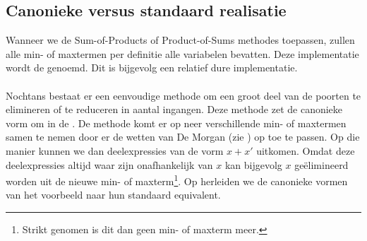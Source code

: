\subsection{Canonieke versus standaard realisatie}
Wanneer we de Sum-of-Products of Product-of-Sums methodes toepassen, zullen alle min- of maxtermen per definitie alle variabelen bevatten. Deze implementatie wordt de  genoemd. Dit is bijgevolg een relatief dure implementatie.

\paragraph{}
Nochtans bestaat er een eenvoudige methode om een groot deel van de poorten te elimineren of te reduceren in aantal ingangen. Deze methode zet de canonieke vorm om in de . De methode komt er op neer verschillende min- of maxtermen samen te nemen door er de wetten van De Morgan (zie ) op toe te passen. Op die manier kunnen we dan deelexpressies van de vorm $x+x'$ uitkomen. Omdat deze deelexpressies altijd waar zijn onafhankelijk van $x$ kan bijgevolg $x$ ge\"elimineerd worden uit de nieuwe min- of maxterm\footnote{Strikt genomen is dit dan geen min- of maxterm meer.}. Op  herleiden we de canonieke vormen van het voorbeeld naar hun standaard equivalent.

